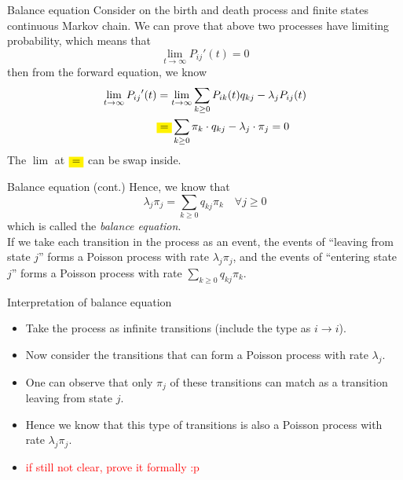 \documentclass[mathserif]{beamer}
\begin{document}
\begin{frame}{Balance equation}
Consider on the birth and death process and finite states continuous Markov chain.
We can prove that above two processes have limiting probability, which means that
\[
\lim_{t\to\infty} {P_{ij}}'(t) = 0
\]
then from the forward equation, we know
\begin{align*}
\lim_{t\to\infty} {P_{ij}}'(t) & = \lim_{t\to\infty} \sum_{k\geq 0} P_{ik}(t) q_{kj} - \lambda_j P_{ij}(t) \\
& \colorbox{yellow}{=} \sum_{k\geq 0}\pi_k\cdot q_{kj} - \lambda_j\cdot \pi_j = 0
\end{align*}
The $\lim$ at $\colorbox{yellow}{=}$ can be swap inside.
\end{frame}

\begin{frame}{Balance equation (cont.)}
Hence, we know that
\[
\lambda_j \pi_j = \sum_{k\geq 0} q_{kj} \pi_k \quad\forall j\geq 0
\]
which is called the \emph{balance equation}. \\
\vspace{\baselineskip}
If we take each transition in the process as an event, the events of ``leaving from state $j$'' forms a Poisson process with rate $\lambda_j \pi_j$, and the events of ``entering state $j$'' forms a Poisson process with rate $\sum_{k\geq 0} q_{kj} \pi_k$.\\
\end{frame}

\begin{frame}{Interpretation of balance equation}
\begin{itemize}
\item Take the process as infinite transitions (include the type as $i\to i$).
\item Now consider the transitions that can form a Poisson process with rate $\lambda_j$.
\item One can observe that only $\pi_j$ of these transitions can match as a transition leaving from state $j$.
\item Hence we know that this type of transitions is also a Poisson process with rate $\lambda_j \pi_j$.
\item \textcolor{red}{if still not clear, prove it formally :p}
\end{itemize}
\end{frame}
\end{document}
